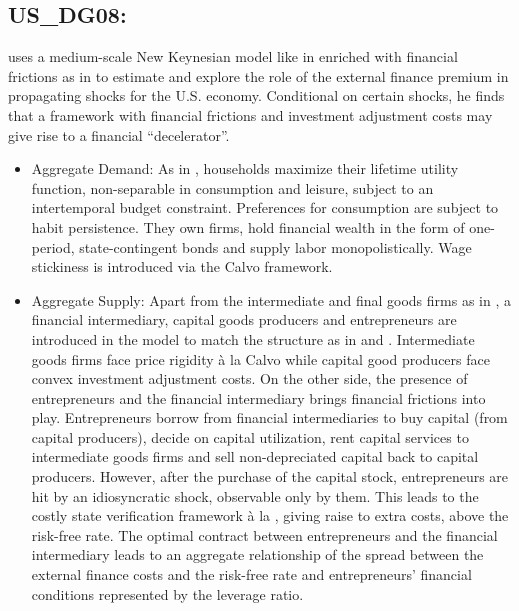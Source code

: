\documentclass[11pt,a4paper]{article}
\begin{document}
	
	
	\subsection{US\_DG08: \cite{DeGraeve2008}}
	\label{USDG08}
	\cite{DeGraeve2008} uses a medium-scale New Keynesian model like in \cite{SmetsWouters2007} enriched with financial frictions as in \cite{BernankeGertlerGilchrist1999} to estimate and explore the role of the external finance premium in propagating shocks for the U.S. economy. Conditional on certain shocks, he finds that a framework with financial frictions and investment adjustment costs may give rise to a financial ``decelerator''.
	
	\begin{itemize}
		
		\item Aggregate Demand: As in \cite{SmetsWouters2007}, households maximize their lifetime utility function, non-separable in consumption and leisure, subject to an intertemporal budget constraint. Preferences for consumption are subject to habit persistence. They own firms, hold financial wealth in the form of one-period, state-contingent bonds and supply labor monopolistically. Wage stickiness is introduced via the Calvo framework.
		
		\item Aggregate Supply: Apart from the intermediate and final goods firms as in \cite{SmetsWouters2007}, a financial intermediary, capital goods producers and entrepreneurs are introduced in the model to match the structure as in \cite{BernankeGertlerGilchrist1999} and \cite{ChristianoMottoRostagno2003}. Intermediate goods firms face price rigidity \`{a} la Calvo while capital good producers face convex investment adjustment costs. On the other side, the presence of entrepreneurs and the financial intermediary brings financial frictions into play. Entrepreneurs borrow from financial intermediaries to buy capital (from capital producers), decide on capital utilization, rent capital services to intermediate goods firms and sell non-depreciated capital back to capital producers. However, after the purchase of the capital stock, entrepreneurs are hit by an idiosyncratic shock, observable only by them. This leads to the costly state verification framework \`{a} la \cite{BernankeGertlerGilchrist1999}, giving raise to extra costs, above the risk-free rate. The optimal contract between entrepreneurs and the financial intermediary leads to an aggregate relationship of the spread between the external finance costs and the risk-free rate and entrepreneurs' financial conditions represented by the leverage ratio.
		

\end{itemize}
\end{document}
